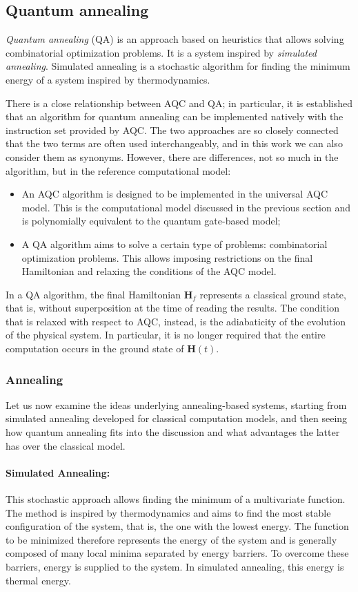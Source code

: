 \subsection{Quantum annealing}
\emph{Quantum annealing} (QA) is an approach based on heuristics that allows solving combinatorial optimization problems. It is a system inspired by \emph{simulated annealing}. Simulated annealing is a stochastic algorithm for finding the minimum energy of a system inspired by thermodynamics.

There is a close relationship between AQC and QA; in particular, it is established that an algorithm for quantum annealing can be implemented natively with the instruction set provided by AQC. The two approaches are so closely connected that the two terms are often used interchangeably, and in this work we can also consider them as synonyms. However, there are differences, not so much in the algorithm, but in the reference computational model:
\begin{itemize}
	\item An AQC algorithm is designed to be implemented in the universal AQC model. This is the computational model discussed in the previous section and is polynomially equivalent to the quantum gate-based model;
	\item A QA algorithm aims to solve a certain type of problems: combinatorial optimization problems. This allows imposing restrictions on the final Hamiltonian and relaxing the conditions of the AQC model.
\end{itemize}
In a QA algorithm, the final Hamiltonian $\mathbf{H}_f$ represents a classical ground state, that is, without superposition at the time of reading the results. The condition that is relaxed with respect to AQC, instead, is the adiabaticity of the evolution of the physical system. In particular, it is no longer required that the entire computation occurs in the ground state of $\mathbf{H}(t)$.

\subsubsection*{Annealing}
Let us now examine the ideas underlying annealing-based systems, starting from simulated annealing developed for classical computation models, and then seeing how quantum annealing fits into the discussion and what advantages the latter has over the classical model.

\paragraph{Simulated Annealing:} This stochastic approach allows finding the minimum of a multivariate function. The method is inspired by thermodynamics and aims to find the most stable configuration of the system, that is, the one with the lowest energy. The function to be minimized therefore represents the energy of the system and is generally composed of many local minima separated by energy barriers. To overcome these barriers, energy is supplied to the system. In simulated annealing, this energy is thermal energy.

